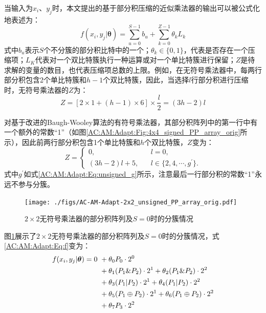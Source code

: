 当输入为$x_i$、$y_j$时，本文提出的基于部分积压缩的近似乘法器的输出可以被公式化地表述为：
\begin{equation}
\label{AC:AM:Adapt:Eq:f}
    f(x_i, y_j \vert \boldsymbol{\theta}) =  \sum\limits_{u=0}^{S-1} b_u + \sum\limits_{k=0}^{Z-1} \theta_k L_k
\end{equation}
式中$b_u$表示$S$个不分簇的部分积比特中的一个；$\theta_k \in \{0, 1\}$，代表是否存在一个压缩项；$L_K$代表对一个双比特簇执行一种运算或对一个单比特簇进行保留；$Z$是待求解的变量的数目，也代表压缩项总数的上限。例如，在无符号乘法器中，每两行部分积包含2个单比特簇和$h-1$个双比特簇，因此，当选择$l$行部分积进行压缩时，无符号乘法器的$Z$为：
\begin{equation}
    \label{AC:AM:Adapt:Eq:Z_unsigned}
      Z = [2 \times 1 + (h-1) \times 6] \times \frac{l}{2} = (3h-2)l
\end{equation}

对基于改进的Baugh-Wooley算法的有符号乘法器，其部分积阵列中的第一行中有一个额外的常数“1”（如图\ref{AC:AM:Adapt:Fig:4x4_signed_PP_array_orig}所示），因此前两行部分积包含1个单比特簇和$h$个双比特簇，$Z$变为：
\begin{equation}
    \label{AC:AM:Adapt:Eq:Z_signed}
        Z = \left\{
          \begin{aligned}
            0 , \ \ \ \ \ \  & \ \ \ \ l = 0, \\
            (3h-2)l + 5, & \ \ \ \  l \in \{2, 4, \cdots, g^{\prime} \}.
            \end{aligned}
          \right.
\end{equation}
式中$g^{\prime}$如式\eqref{AC:AM:Adapt:Eq:unsigned_g}所示，注意最后一行部分积的常数“1”永远不参与分簇。

\begin{figure}[!ht]
    \centering
    \texttt{[image: ./figs/AC-AM-Adapt-2x2\_unsigned\_PP\_array\_orig.pdf]}
    \caption{$2\times2$无符号乘法器的部分积阵列及$S = 0$时的分簇情况}
    \label{AC:AM:Adapt:Fig:2x2_unsigned_PP_array_ori}
\end{figure}

图\ref{AC:AM:Adapt:Fig:2x2_unsigned_PP_array_ori}展示了$2\times2$无符号乘法器的部分积阵列及$S = 0$时的分簇情况，式\eqref{AC:AM:Adapt:Eq:f}变为：
\begin{align}
      f(x_i, y_j \vert \boldsymbol{\theta}) = 0 
       &\ + \theta_0 P_0 \cdot 2^0 \notag \notag \\
       &\ + \theta_1 ( P_1 \& P_2 ) \cdot 2^1 + \theta_2 ( P_1 \& P_2 ) \cdot 2^2 \notag \\
       &\ + \theta_3 ( P_1 | P_2 ) \cdot 2^1 + \theta_4 ( P_1 | P_2 ) \cdot 2^2 \notag \\
       &\ + \theta_5 ( P_1 \oplus P_2 ) \cdot 2^1 + \theta_6 ( P_1 \oplus P_2 ) \cdot 2^2 \notag \\
       &\ +\theta_7 P_3 \cdot 2^2
       \label{AC:AM:Adapt:Eq:2x2_unsigned_f}
\end{align}

